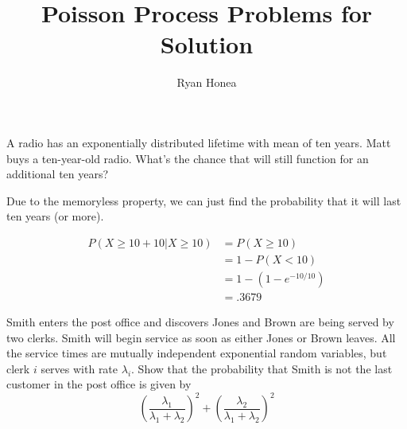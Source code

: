 \documentclass[10pt,a4paper]{exam}
\author{Ryan Honea}
\title{Poisson Process Problems for Solution}
\begin{document}
\maketitle

\printanswers
\begin{questions}
\question A radio has an exponentially distributed lifetime with mean of ten years. Matt buys a ten-year-old radio. What's the chance that will still function for an additional ten years?

\begin{solution}
Due to the memoryless property, we can just find the probability that it will last ten years (or more).

\begin{align*}
P(X \geq 10 + 10|X \geq 10) 	&= P(X \geq 10)\\
										&= 1 - P(X < 10)\\
										&= 1 - ( 1 - e^{-10/10})\\
										&= .3679
\end{align*}
\end{solution}

\question Smith enters the post office and discovers Jones and Brown are being served by two clerks. Smith will begin service as soon as either Jones or Brown leaves. All the service times are mutually independent exponential random variables, but clerk $i$ serves with rate $\lambda_i$. Show that the probability that Smith is not the last customer in the post office is given by
$$\left(\frac{\lambda_1}{\lambda_1 + \lambda_2}\right)^2 + \left(\frac{\lambda_2}{\lambda_1 + \lambda_2}\right)^2$$


\end{questions}
\end{document}
